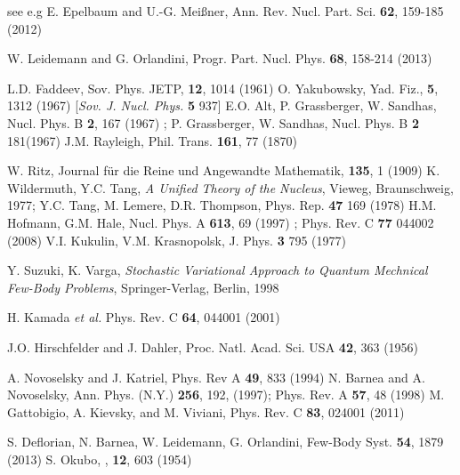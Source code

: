 \begin{thebibliography}{00}
 see e.g E. Epelbaum and U.-G. Mei{\ss}ner, Ann. Rev. Nucl. Part. Sci. {\bf 62}, 159-185 (2012)

 W. Leidemann and G. Orlandini,  Progr. Part.  Nucl. Phys. {\bf 68}, 158-214  (2013)

 L.D. Faddeev,
        Sov. Phys. JETP, {\bf 12}, 1014 (1961)
 O. Yakubowsky,   
        Yad. Fiz., {\bf 5}, 1312 (1967) [{\it Sov. J. Nucl. Phys.} {\bf 5} 937] 
  E.O. Alt, P. Grassberger, W. Sandhas, Nucl. Phys. B {\bf 2},  167 (1967) ;
               P. Grassberger, W. Sandhas, Nucl. Phys. B {\bf 2} 181(1967) 
 J.M. Rayleigh, Phil. Trans. {\bf 161}, 77 (1870)

 W. Ritz, 
   Journal f\"ur die Reine und Angewandte Mathematik, {\bf 135}, 1 (1909)
 K. Wildermuth, Y.C. Tang, \textit{A Unified Theory of the Nucleus}, Vieweg, Braunschweig, 1977;
                Y.C. Tang, M. Lemere, D.R. Thompson, Phys. Rep. {\bf 47} 169 (1978) 
 H.M. Hofmann, G.M. Hale, Nucl. Phys. A {\bf 613}, 69 (1997) ;
             Phys. Rev. C {\bf 77} 044002 (2008) 
 V.I. Kukulin, V.M. Krasnopolsk, J. Phys. {\bf 3}  795 (1977)

  Y. Suzuki, K. Varga, \textit{Stochastic Variational Approach to Quantum Mechnical Few-Body Problems},
                  Springer-Verlag, Berlin, 1998
                  
  H. Kamada {\it et al.} Phys. Rev. C {\bf 64}, 044001 (2001)       

 J.O. Hirschfelder and J. Dahler, Proc. Natl. Acad. Sci. USA {\bf 42}, 363 (1956)                                 

 A. Novoselsky and J.  Katriel,  
	 Phys. Rev A {\bf 49},  833  (1994)
  N. Barnea  and A. Novoselsky,
	 Ann. Phys. (N.Y.)  {\bf 256}, 192, (1997); Phys. Rev.  A {\bf 57},  48 (1998)
  M. Gattobigio, A. Kievsky, and M. Viviani, Phys. Rev. C {\bf 83}, 024001 (2011)

	 S. Deflorian, N. Barnea, W. Leidemann, G. Orlandini, Few-Body Syst. {\bf 54}, 1879 (2013) 
 S. Okubo, \PRO, {\bf 12}, 603 (1954)


\end{thebibliography}
